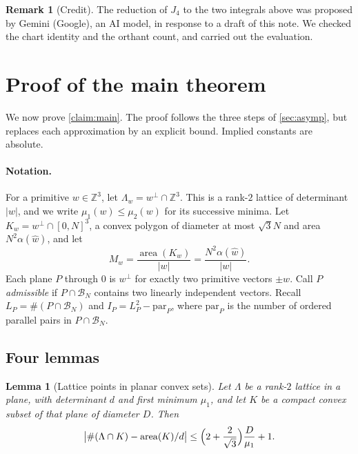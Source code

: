 \documentclass[11pt]{article}
\newtheorem{lemma}[theorem]{Lemma}
\theoremstyle{definition}
\newtheorem{remark}[theorem]{Remark}
\newcommand{\Z}{\mathbb{Z}}
\newcommand{\BN}{\mathcal{B}_N}
\newcommand{\abs}[1]{\left\lvert #1 \right\rvert}
\begin{document}
\begin{remark}[Credit]
The reduction of $J_4$ to the two integrals above was proposed by Gemini (Google), an AI model, in response to a draft of this note. We checked the chart identity and the orthant count, and carried out the evaluation.
\end{remark}

\section{Proof of the main theorem}\label{sec:proof}

We now prove \cref{claim:main}. The proof follows the three steps of \cref{sec:asymp}, but replaces each approximation by an explicit bound. Implied constants are absolute.

\paragraph{Notation.} For a primitive $w\in\Z^3$, let $\Lambda_w=w^\perp\cap\Z^3$. This is a rank-$2$ lattice of determinant $\abs w$, and we write $\mu_1(w)\le\mu_2(w)$ for its successive minima. Let $K_w=w^\perp\cap[0,N]^3$, a convex polygon of diameter at most $\sqrt3N$ and area $N^2\alpha(\hat w)$, and let
\[
M_w=\frac{\operatorname{area}(K_w)}{\abs w}=\frac{N^2\alpha(\hat w)}{\abs w}.
\]
Each plane $P$ through $0$ is $w^\perp$ for exactly two primitive vectors $\pm w$. Call $P$ \emph{admissible} if $P\cap\BN$ contains two linearly independent vectors. Recall $L_P=\#(P\cap\BN)$ and $I_P=L_P^2-\mathrm{par}_P$, where $\mathrm{par}_P$ is the number of ordered parallel pairs in $P\cap\BN$.

\subsection{Four lemmas}

\begin{lemma}[Lattice points in planar convex sets]\label{lem:planar}
Let $\Lambda$ be a rank-$2$ lattice in a plane, with determinant $d$ and first minimum $\mu_1$, and let $K$ be a compact convex subset of that plane of diameter $D$. Then
\[
\bigl|\#(\Lambda\cap K)-\operatorname{area}(K)/d\bigr|\le\Bigl(2+\frac{2}{\sqrt3}\Bigr)\frac{D}{\mu_1}+1.
\]
\end{lemma}
\end{document}
